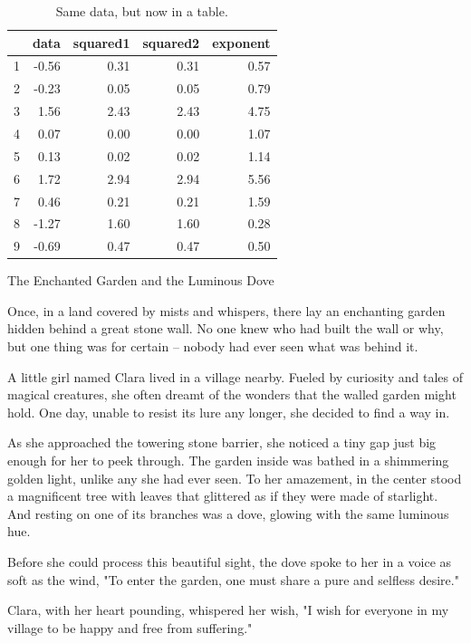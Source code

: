 \documentclass[10pt, a4paper, titlepage]{article}
\begin{document}
\begin{table}[ht]
\caption {Same data, but now in a table.}
\centering
\begin{tabular}{rrrrr}
  \hline
 & data & squared1 & squared2 & exponent \\ 
  \hline
1 & -0.56 & 0.31 & 0.31 & 0.57 \\ 
  2 & -0.23 & 0.05 & 0.05 & 0.79 \\ 
  3 & 1.56 & 2.43 & 2.43 & 4.75 \\ 
  4 & 0.07 & 0.00 & 0.00 & 1.07 \\ 
  5 & 0.13 & 0.02 & 0.02 & 1.14 \\ 
  6 & 1.72 & 2.94 & 2.94 & 5.56 \\ 
  7 & 0.46 & 0.21 & 0.21 & 1.59 \\ 
  8 & -1.27 & 1.60 & 1.60 & 0.28 \\ 
  9 & -0.69 & 0.47 & 0.47 & 0.50 \\ 
   \hline
\end{tabular}

\end{table}

\newpage
\restoregeometry
The Enchanted Garden and the Luminous Dove

Once, in a land covered by mists and whispers, there lay an enchanting garden hidden behind a great stone wall. No one knew who had built the wall or why, but one thing was for certain – nobody had ever seen what was behind it.

A little girl named Clara lived in a village nearby. Fueled by curiosity and tales of magical creatures, she often dreamt of the wonders that the walled garden might hold. One day, unable to resist its lure any longer, she decided to find a way in.

As she approached the towering stone barrier, she noticed a tiny gap just big enough for her to peek through. The garden inside was bathed in a shimmering golden light, unlike any she had ever seen. To her amazement, in the center stood a magnificent tree with leaves that glittered as if they were made of starlight. And resting on one of its branches was a dove, glowing with the same luminous hue.

Before she could process this beautiful sight, the dove spoke to her in a voice as soft as the wind, "To enter the garden, one must share a pure and selfless desire."

Clara, with her heart pounding, whispered her wish, "I wish for everyone in my village to be happy and free from suffering."
\end{document}
